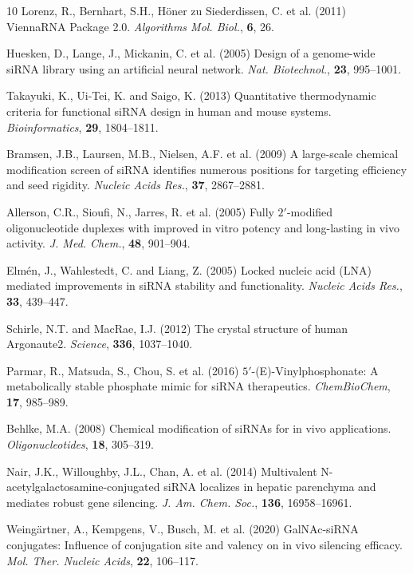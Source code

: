 \documentclass[twocolumn]{article}
\begin{document}
\begin{thebibliography}{10}
Lorenz, R., Bernhart, S.H., Höner zu Siederdissen, C. et al. (2011) ViennaRNA Package 2.0. \textit{Algorithms Mol. Biol.}, \textbf{6}, 26.

Huesken, D., Lange, J., Mickanin, C. et al. (2005) Design of a genome-wide siRNA library using an artificial neural network. \textit{Nat. Biotechnol.}, \textbf{23}, 995--1001.

Takayuki, K., Ui-Tei, K. and Saigo, K. (2013) Quantitative thermodynamic criteria for functional siRNA design in human and mouse systems. \textit{Bioinformatics}, \textbf{29}, 1804--1811.

Bramsen, J.B., Laursen, M.B., Nielsen, A.F. et al. (2009) A large-scale chemical modification screen of siRNA identifies numerous positions for targeting efficiency and seed rigidity. \textit{Nucleic Acids Res.}, \textbf{37}, 2867--2881.

Allerson, C.R., Sioufi, N., Jarres, R. et al. (2005) Fully $2'$-modified oligonucleotide duplexes with improved in vitro potency and long-lasting in vivo activity. \textit{J. Med. Chem.}, \textbf{48}, 901--904.

Elmén, J., Wahlestedt, C. and Liang, Z. (2005) Locked nucleic acid (LNA) mediated improvements in siRNA stability and functionality. \textit{Nucleic Acids Res.}, \textbf{33}, 439--447.

Schirle, N.T. and MacRae, I.J. (2012) The crystal structure of human Argonaute2. \textit{Science}, \textbf{336}, 1037--1040.

Parmar, R., Matsuda, S., Chou, S. et al. (2016) $5'$-(E)-Vinylphosphonate: A metabolically stable phosphate mimic for siRNA therapeutics. \textit{ChemBioChem}, \textbf{17}, 985--989.

Behlke, M.A. (2008) Chemical modification of siRNAs for in vivo applications. \textit{Oligonucleotides}, \textbf{18}, 305--319.

Nair, J.K., Willoughby, J.L., Chan, A. et al. (2014) Multivalent N-acetylgalactosamine-conjugated siRNA localizes in hepatic parenchyma and mediates robust gene silencing. \textit{J. Am. Chem. Soc.}, \textbf{136}, 16958--16961.

Weingärtner, A., Kempgens, V., Busch, M. et al. (2020) GalNAc-siRNA conjugates: Influence of conjugation site and valency on in vivo silencing efficacy. \textit{Mol. Ther. Nucleic Acids}, \textbf{22}, 106--117.


\end{thebibliography}
\end{document}

